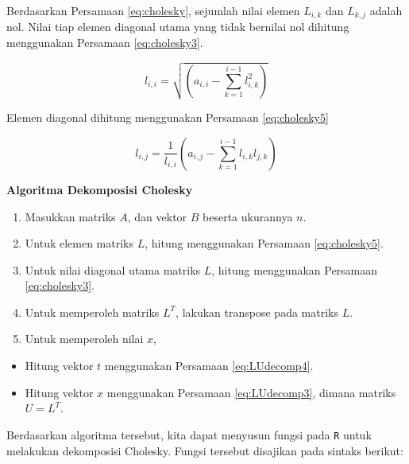 \documentclass[]{book}
\providecommand{\tightlist}{%
  \setlength{\itemsep}{0pt}\setlength{\parskip}{0pt}}
\theoremstyle{definition}
\theoremstyle{definition}
\theoremstyle{definition}
\theoremstyle{remark}
\begin{document}
Berdasarkan Persamaan \eqref{eq:cholesky}, sejumlah nilai elemen \(L_{i,k}\) dan \(L_{k,j}\) adalah nol. Nilai tiap elemen diagonal utama yang tidak bernilai nol dihitung menggunakan Persamaan \eqref{eq:cholesky3}.

\begin{equation}
l_{i,i}=\sqrt{\left(a_{i,i}-\sum_{k=1}^{i-1}l_{i,k}^2\right)}
  \label{eq:cholesky3}
\end{equation}

Elemen diagonal dihitung menggunakan Persamaan \eqref{eq:cholesky5}

\begin{equation}
l_{i,j}=\frac{1}{l_{i,i}}\left(a_{i,j}-\sum_{k=1}^{i-1}l_{i,k}l_{j,k}\right)
  \label{eq:cholesky5}
\end{equation}

\textbf{Algoritma Dekomposisi Cholesky}

\begin{enumerate}
\def\labelenumi{\arabic{enumi}.}
\tightlist
\item
  Masukkan matriks \(A\), dan vektor \(B\) beserta ukurannya \(n\).
\item
  Untuk elemen matriks \(L\), hitung menggunakan Persamaan \eqref{eq:cholesky5}.
\item
  Untuk nilai diagonal utama matriks \(L\), hitung menggunakan Persamaan \eqref{eq:cholesky3}.
\item
  Untuk memperoleh matriks \(L^T\), lakukan transpose pada matriks \(L\).
\item
  Untuk memperoleh nilai \(x\),
\end{enumerate}

\begin{itemize}
\tightlist
\item
  Hitung vektor \(t\) menggunakan Persamaan \eqref{eq:LUdecomp4}.
\item
  Hitung vektor \(x\) menggunakan Persamaan \eqref{eq:LUdecomp3}, dimana matriks \(U=L^T\).
\end{itemize}

Berdasarkan algoritma tersebut, kita dapat menyusun fungsi pada \texttt{R} untuk melakukan dekomposisi Cholesky. Fungsi tersebut disajikan pada sintaks berikut:
\end{document}
